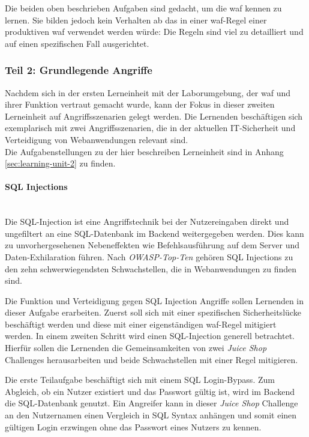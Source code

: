 Die beiden oben beschrieben Aufgaben sind gedacht, um die \ac{waf} kennen zu lernen.
Sie bilden jedoch kein Verhalten ab das in einer \ac{waf}-Regel einer produktiven \ac{waf} verwendet werden würde:
Die Regeln sind viel zu detailliert und auf einen spezifischen Fall ausgerichtet.

\subsubsection{Teil 2: Grundlegende Angriffe}
\label{sec:learning-unit-2-meta}

Nachdem sich in der ersten Lerneinheit mit der Laborumgebung, der \ac{waf} und ihrer Funktion vertraut gemacht wurde, kann der Fokus in dieser zweiten Lerneinheit auf Angriffsszenarien gelegt werden.
Die Lernenden beschäftigen sich exemplarisch mit zwei Angriffsszenarien, die in der aktuellen IT-Sicherheit und Verteidigung von Webanwendungen relevant sind.\\

Die Aufgabenstellungen zu der hier beschreiben Lerneinheit sind in Anhang \ref{sec:learning-unit-2} zu finden.

\paragraph{SQL Injections}\ \\
Die SQL-Injection ist eine Angriffstechnik bei der Nutzereingaben direkt und ungefiltert an eine SQL-Datenbank im Backend weitergegeben werden.
Dies kann zu unvorhergesehenen Nebeneffekten wie Befehlsausführung auf dem Server und Daten-Exhilaration führen.
Nach \textit{OWASP-Top-Ten} gehören SQL Injections zu den zehn schwerwiegendsten Schwachstellen, die in Webanwendungen zu finden sind.

Die Funktion und Verteidigung gegen SQL Injection Angriffe sollen Lernenden in dieser Aufgabe erarbeiten.
Zuerst soll sich mit einer spezifischen Sicherheitslücke beschäftigt werden und diese mit einer eigenständigen \ac{waf}-Regel mitigiert werden.
In einem zweiten Schritt wird einen SQL-Injection generell betrachtet.
Hierfür sollen die Lernenden die Gemeinsamkeiten von zwei \textit{Juice Shop} Challenges herausarbeiten und beide Schwachstellen mit einer Regel mitigieren.

Die erste Teilaufgabe beschäftigt sich mit einem SQL Login-Bypass.
Zum Abgleich, ob ein Nutzer existiert und das Passwort gültig ist, wird im Backend die SQL-Datenbank genutzt.
Ein Angreifer kann in dieser \textit{Juice Shop} Challenge an den Nutzernamen einen Vergleich in SQL Syntax anhängen und somit einen gültigen Login erzwingen ohne das Passwort eines Nutzers zu kennen.

